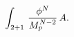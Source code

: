 \begin{equation}
\label{braneAphi}
 \int_{2 + 1} \, {\phi^N \over M_p^{N-2}} \, A .
\label{phiNA}
\end{equation}

